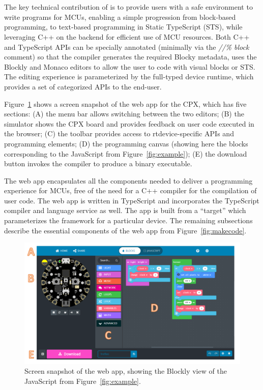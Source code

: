 \section{\MC}
\label{sec:makecode}
The key technical contribution of \MC is to provide users with a safe environment to write programs for MCUs, enabling a simple progression from block-based
programming, to text-based programming in Static TypeScript (STS),
while leveraging C++ on the backend for efficient use of MCU resources.
Both C++ and TypeScript APIs can be specially annotated (minimally via
the \emph{//\% block} comment) so that the \MC compiler generates the required
Blocky metadata,
\MC uses the Blockly and Monaco editors to allow the user to code with
visual blocks or STS. The editing experience is parameterized by the full-typed device
runtime, which provides a set of categorized APIs to the end-user.

Figure~\ref{fig:screenSnap} shows a screen snapshot of the \MC web app for the CPX,
which has five sections:
(A) the menu bar allows switching between the two editors;
(B) the simulator shows the CPX board and provides feedback on user code executed in the browser;
(C) the toolbar provides access to rtdevice-specific APIs and programming elements;
(D) the programming canvas (showing here the blocks corresponding to the JavaScript from Figure~\ref{fig:example});
(E) the download button invokes the compiler to produce a binary executable.

The web app encapsulates all the components needed to deliver a programming experience
for MCUs, free of the need for a C++ compiler for the compilation of user code.
The web app is written in TypeScript and incorporates the TypeScript compiler and
language service as well.
The app is built from a \MC ``target''
which parameterizes the \MC framework for a particular device.
The remaining subsections describe the essential components of the web app
from Figure~\ref{fig:makecode}.


\begin{figure}[t]
    \includegraphics[width=6in]{CPXfig.pdf}
\caption{\label{fig:screenSnap}Screen snapshot of the \MC web app, showing the Blockly
view of the JavaScript from Figure~\ref{fig:example}.}
\end{figure}


